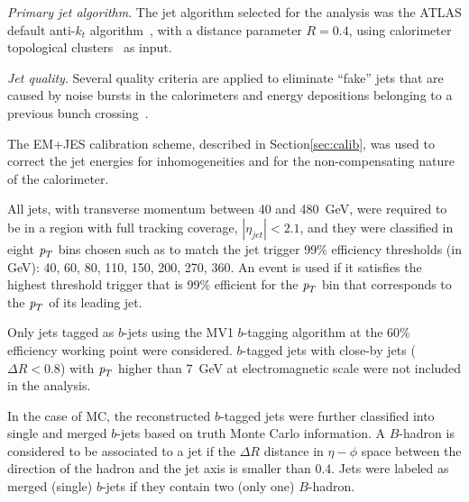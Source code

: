 \emph{Primary jet algorithm}. The jet algorithm selected for the analysis was the ATLAS default anti-$k_t$ algorithm~\cite{antiktalg}, with a distance parameter $R = 0.4$, using calorimeter topological clusters~\cite{topoClusters} as input.

  
\emph{Jet quality}.  Several quality criteria are applied to eliminate ``fake'' jets that are caused by noise bursts in the calorimeters and energy depositions belonging to a previous bunch crossing~\cite{ATLAS-CONF-2012-020}.



The EM+JES calibration scheme, described in Section\ref{sec:calib}, was used to correct the jet energies for inhomogeneities and for the non-compensating nature of the calorimeter.

All jets, with transverse momentum between 40 and 480~GeV,  were required to be in a region with full tracking coverage, $|\eta_{jet}|<2.1$, and they were classified in eight ${\emph{p}_{T}}$ bins chosen such as to match the jet trigger 99\% efficiency thresholds (in GeV): 40, 60, 80, 110, 150, 200, 270, 360. An event is used if it satisfies the highest threshold trigger that is 99\% efficient for the ${\emph{p}_{T}}$ bin that corresponds to the ${\emph{p}_{T}}$ of its leading jet.

 Only jets tagged as $b$-jets using the MV1 $b$-tagging algorithm at the 60\% efficiency working point were considered. $b$-tagged jets with close-by jets ($\Delta R < 0.8$) with ${\emph{p}_{T}}$ higher than 7~GeV at electromagnetic scale were not included in the analysis. %


In the case of MC, the reconstructed $b$-tagged jets were further classified into single and merged $b$-jets based on truth Monte Carlo information. A $B$-hadron is considered to be associated to a jet if the $\Delta R$ distance in $\eta-\phi$ space between the direction of the hadron and the jet axis is smaller than 0.4. Jets were labeled as merged (single) $b$-jets if they contain two (only one) $B$-hadron.%

 





